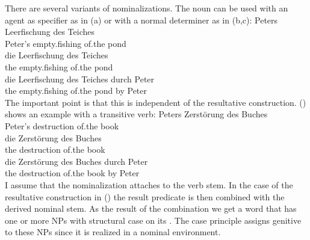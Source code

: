 There are several variants of nominalizations. The noun can be used with an agent as specifier as in
(a) or with a normal determiner as in (b,c):
\eal
\ex 
\gll Peters Leerfischung des Teiches\\
     Peter's empty.fishing of.the pond\\
\ex 
\gll die Leerfischung des Teiches\\
     the empty.fishing of.the pond\\
\ex 
\gll die Leerfischung des Teiches durch Peter\\
     the empty.fishing of.the pond by Peter\\
\zl
The important point is that this is independent of the resultative construction. () shows an
example with a transitive verb:
\eal
\ex 
\gll Peters Zerstörung des Buches\\
     Peter's destruction of.the book\\
\ex 
\gll die Zerstörung des Buches\\
     the destruction of.the book\\
\ex 
\gll die Zerstörung des Buches durch Peter\\
     the destruction of.the book by Peter\\
\zl
I assume that the nominalization attaches to the verb stem. In the case of the resultative
construction in () the result predicate is then combined with the derived nominal stem. As the result of the combination we
get a word that has one or more NPs with structural case on its \argstl. The case principle assigns genitive
to these NPs since it is realized in a nominal environment.




